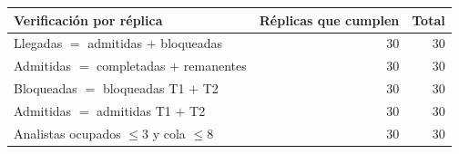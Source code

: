 \begin{tabular}{lrr}
\toprule
Verificación por réplica & Réplicas que cumplen & Total \\
\midrule
Llegadas $=$ admitidas $+$ bloqueadas & 30 & 30 \\
Admitidas $=$ completadas $+$ remanentes & 30 & 30 \\
Bloqueadas $=$ bloqueadas T1 $+$ T2 & 30 & 30 \\
Admitidas $=$ admitidas T1 $+$ T2 & 30 & 30 \\
Analistas ocupados $\le 3$ y cola $\le 8$ & 30 & 30 \\
\bottomrule
\end{tabular}
